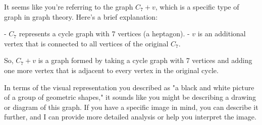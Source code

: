 It seems like you're referring to the graph \(C_7 + v\), which is a specific type of graph in graph theory. Here's a brief explanation:

- \(C_7\) represents a cycle graph with 7 vertices (a heptagon).
- \(v\) is an additional vertex that is connected to all vertices of the original \(C_7\).

So, \(C_7 + v\) is a graph formed by taking a cycle graph with 7 vertices and adding one more vertex that is adjacent to every vertex in the original cycle.

In terms of the visual representation you described as "a black and white picture of a group of geometric shapes," it sounds like you might be describing a drawing or diagram of this graph. If you have a specific image in mind, you can describe it further, and I can provide more detailed analysis or help you interpret the image.